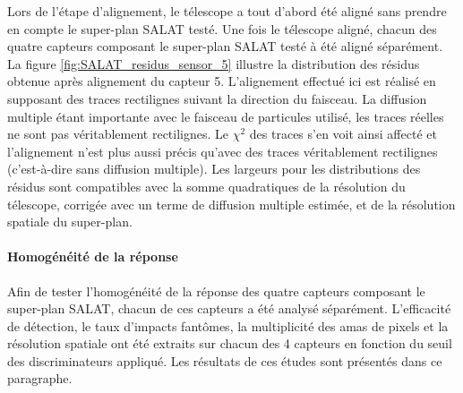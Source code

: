   Lors de l'\'etape d'alignement, le t\'elescope a tout d'abord \'et\'e align\'e sans prendre en compte le super-plan SALAT test\'e. Une fois le t\'elescope align\'e, chacun des quatre capteurs composant le super-plan SALAT test\'e \`a \'et\'e align\'e s\'epar\'ement. La figure \ref{fig:SALAT_residus_sensor_5} illustre la distribution des r\'esidus obtenue apr\`es alignement du capteur 5. L'alignement effectu\'e ici est r\'ealis\'e en supposant des traces rectilignes suivant la direction du faisceau. La diffusion multiple \'etant importante avec le faisceau de particules utilis\'e, les traces r\'eelles ne sont pas v\'eritablement rectilignes. Le $\chi^2$ des traces s'en voit ainsi affect\'e et l'alignement n'est plus aussi pr\'ecis qu'avec des traces v\'eritablement rectilignes (c'est-à-dire sans diffusion multiple). Les largeurs pour les distributions des r\'esidus sont compatibles avec la somme quadratiques de la r\'esolution du t\'elescope, corrig\'ee avec un terme de diffusion multiple estim\'ee, et de la r\'esolution spatiale du super-plan.
  
  \paragraph{Homog\'en\'eit\'e de la r\'eponse}
  
  \medskip
  
  Afin de tester l'homog\'en\'eit\'e de la r\'eponse des quatre capteurs composant le super-plan SALAT, chacun de ces capteurs a \'et\'e analys\'e s\'epar\'ement. L'efficacit\'e de d\'etection, le taux d'impacts fant\^omes, la multiplicit\'e des amas de pixels et la r\'esolution spatiale ont \'et\'e extraits sur chacun des 4 capteurs en fonction du seuil des discriminateurs appliqu\'e. Les r\'esultats de ces \'etudes sont pr\'esent\'es dans ce paragraphe.
  
   
